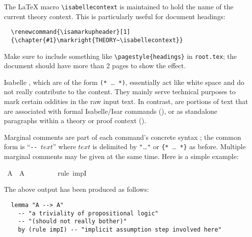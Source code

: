 \begin{isabellebody}
\begin{isamarkuptext}
  \medskip The {\LaTeX} macro \verb,\isabellecontext, is maintained to
  hold the name of the current theory context.  This is particularly
  useful for document headings:

\begin{verbatim}
  \renewcommand{\isamarkupheader}[1]
  {\chapter{#1}\markright{THEORY~\isabellecontext}}
\end{verbatim}

  \noindent Make sure to include something like
  \verb,\pagestyle{headings}, in \texttt{root.tex}; the document
  should have more than 2 pages to show the effect.%
\end{isamarkuptext}%
\isamarkuptrue%
%
\isamarkuptrue%
%
\begin{isamarkuptext}%
Isabelle , which are of the form
  \verb,(,\verb,*,~\dots~\verb,*,\verb,),, essentially act like white
  space and do not really contribute to the content.  They mainly
  serve technical purposes to mark certain oddities in the raw input
  text.  In contrast,  are portions of text
  that are associated with formal Isabelle/Isar commands
  (), or as standalone paragraphs within a
  theory or proof context ().

  \medskip Marginal comments are part of each command's concrete
  syntax \cite{isabelle-ref}; the common form is ``\verb,--,~$text$''
  where $text$ is delimited by \verb,",\dots\verb,", or
  \verb,{,\verb,*,~\dots~\verb,*,\verb,}, as before.  Multiple
  marginal comments may be given at the same time.  Here is a simple
  example:%
\end{isamarkuptext}%
\isamarkuptrue%
\ {\isachardoublequote}A\ {\isacharminus}{\isacharminus}{\isachargreater}\ A{\isachardoublequote}\isanewline
\ \ %
\isanewline
\ \ %
\isanewline
\ \ \isamarkupfalse%
\ {\isacharparenleft}rule\ impI{\isacharparenright}\ %
\isamarkupfalse%
%
\begin{isamarkuptext}%
\noindent The above output has been produced as follows:

\begin{verbatim}
  lemma "A --> A"
    -- "a triviality of propositional logic"
    -- "(should not really bother)"
    by (rule impI) -- "implicit assumption step involved here"
\end{verbatim}


\end{isamarkuptext}
\end{isabellebody}
